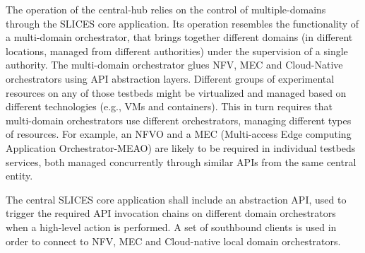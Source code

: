 The operation of the central-hub relies on the control of multiple-domains through the SLICES core application. Its operation resembles the functionality of a multi-domain orchestrator, that brings together different domains (in different locations, managed from different authorities) under the supervision of a single authority. The multi-domain orchestrator glues NFV, MEC and Cloud-Native orchestrators using API abstraction layers. Different groups of experimental resources on any of those testbeds might be virtualized and managed based on different technologies (e.g., VMs and containers). This in turn requires that multi-domain orchestrators use different orchestrators, managing different types of resources. For example, an NFVO and a MEC (Multi-access Edge computing Application Orchestrator-MEAO) are likely to be required in individual testbeds services, both managed concurrently through similar APIs from the same central entity.


The central SLICES core application shall include an abstraction API, used to trigger the required API invocation chains on different domain orchestrators when a high-level action is performed. A set of southbound clients is used in order to connect to NFV, MEC and Cloud-native local domain orchestrators. 




